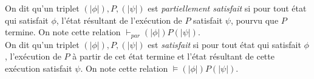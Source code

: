 \documentclass[a4paper]{article}
\begin{document}
  On dit qu'un triplet $(|\phi|), P, (|\psi|)$ est \textit{partiellement satisfait} si
  pour tout état qui satisfait $\phi$, l'état résultant de l'exécution de $P$
  satisfait $\psi$, pourvu que $P$ termine. On note cette relation $\vdash_{par} (|\phi|)P(|\psi|)$.\\

  On dit qu'un triplet $(|\phi|), P, (|\psi|)$ est \textit{satisfait} si
  pour tout état qui satisfait $\phi$, l'exécution de $P$ à partir de cet état termine
  et l'état résultant de cette exécution satisfait $\psi$. On note cette relation $\vDash (|\phi|)P(|\psi|)$.
\end{document}

